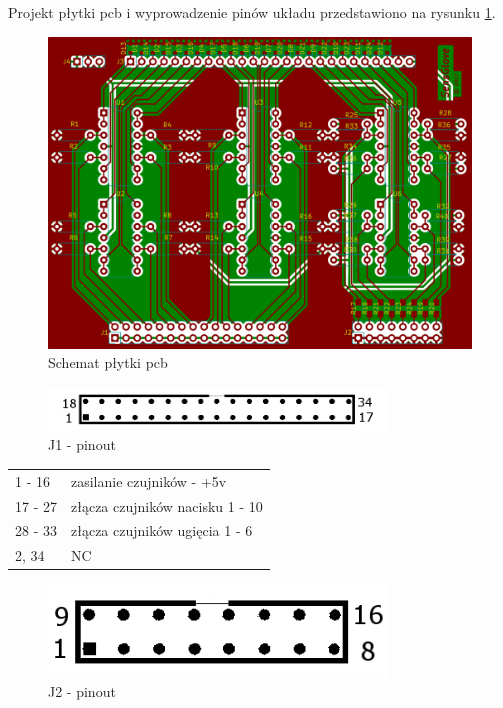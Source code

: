 \documentclass{article}
\begin{document}
Projekt płytki pcb i wyprowadzenie pinów układu przedstawiono na rysunku  \ref{rys:pcb}.

\begin{figure}[H]
	\centering
	\includegraphics[width=12cm]{pcb.png}
	\caption{Schemat płytki pcb}
	\label{rys:pcb}
\end{figure}

\begin{figure}[H]
	\centering
	\includegraphics[width=9cm]{J1.png}
	\caption{J1 - pinout}
	\label{rys:J1 - pinout}
\end{figure}

\begin{table}[H]
	\centering
	\label{J1 - pinout}
	\begin{tabular}{ll}
	1 - 16		&	zasilanie czujników - +5v		\\
	17 - 27		&	złącza czujników nacisku 1 - 10		\\
	28 - 33		&	złącza czujników ugięcia 1 - 6		\\
	2, 34		&	NC					\\
\end{tabular}
\end{table}

\begin{figure}[H]
	\centering
	\includegraphics[width=9cm]{J2.png}
	\caption{J2 - pinout}
	\label{rys:J2 - pinout}
\end{figure}
\end{document}
